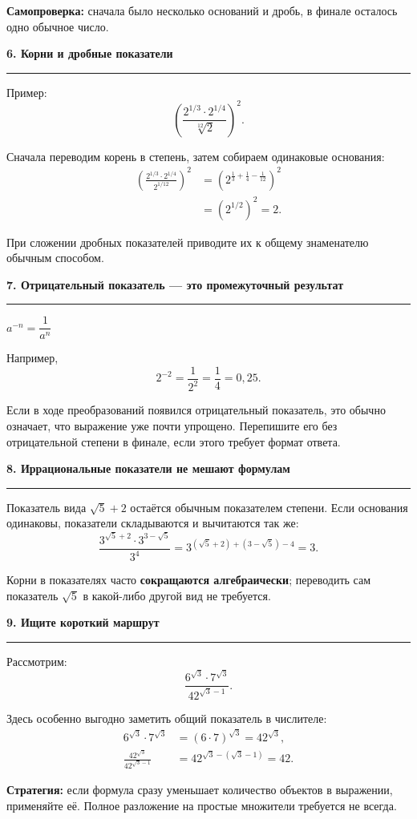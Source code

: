 \documentclass[a4paper,12pt]{article}
\newcommand{\sectionline}[1]{%
  \vspace{0.65em}%
  {\large\bfseries\color{darkaccent}#1}\par
  \vspace{0.18em}\color{rulegray}\hrule\color{textgray}\vspace{0.45em}%
}
\newcommand{\formula}[1]{%
  \begin{center}
    \color{darkaccent}\large$#1$
  \end{center}
}
\begin{document}
\textbf{Самопроверка:} сначала было несколько оснований и дробь, в финале осталось одно обычное число.

\clearpage

\sectionline{6. Корни и дробные показатели}

Пример:
\[
\left(\frac{2^{1/3}\cdot2^{1/4}}{\sqrt[12]{2}}\right)^2.
\]

Сначала переводим корень в степень, затем собираем одинаковые основания:
\begin{align*}
\left(\frac{2^{1/3}\cdot2^{1/4}}{2^{1/12}}\right)^2
&=\left(2^{\frac13+\frac14-\frac1{12}}\right)^2\\
&=\left(2^{1/2}\right)^2=2.
\end{align*}

При сложении дробных показателей приводите их к общему знаменателю обычным способом.

\sectionline{7. Отрицательный показатель — это промежуточный результат}

\formula{a^{-n}=\dfrac{1}{a^n}}

Например,
\[
2^{-2}=\frac{1}{2^2}=\frac14=0{,}25.
\]

Если в ходе преобразований появился отрицательный показатель, это обычно означает, что выражение уже почти упрощено. Перепишите его без отрицательной степени в финале, если этого требует формат ответа.

\sectionline{8. Иррациональные показатели не мешают формулам}

Показатель вида $\sqrt5+2$ остаётся обычным показателем степени. Если основания одинаковы, показатели складываются и вычитаются так же:
\[
\frac{3^{\sqrt5+2}\cdot3^{3-\sqrt5}}{3^4}
=3^{(\sqrt5+2)+(3-\sqrt5)-4}=3.
\]

Корни в показателях часто \textbf{сокращаются алгебраически}; переводить сам показатель $\sqrt5$ в какой-либо другой вид не требуется.

\sectionline{9. Ищите короткий маршрут}

Рассмотрим:
\[
\frac{6^{\sqrt3}\cdot7^{\sqrt3}}{42^{\sqrt3-1}}.
\]

Здесь особенно выгодно заметить общий показатель в числителе:
\begin{align*}
6^{\sqrt3}\cdot7^{\sqrt3}
&=(6\cdot7)^{\sqrt3}=42^{\sqrt3},\\
\frac{42^{\sqrt3}}{42^{\sqrt3-1}}
&=42^{\sqrt3-(\sqrt3-1)}=42.
\end{align*}

\textbf{Стратегия:} если формула сразу уменьшает количество объектов в выражении, применяйте её. Полное разложение на простые множители требуется не всегда.
\end{document}
